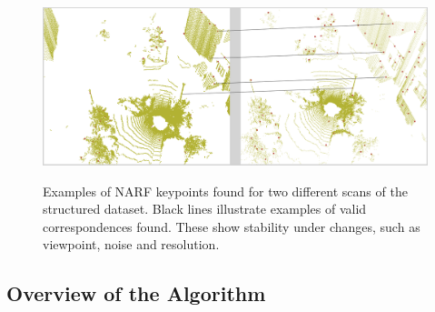 \begin{figure}[H]
    \centering
    \includegraphics[width=0.995\linewidth]{img/chap_slam/features_line.png}\\
    \caption{Examples of NARF keypoints found for two different scans of the structured dataset. Black lines illustrate examples of valid correspondences found. These show stability under changes, such as viewpoint, noise and resolution.}
    \label{fig:chap_slam_features_correspondences}
\end{figure}


\subsection{Overview of the Algorithm}
\label{ssec:chap_slam_algo}

